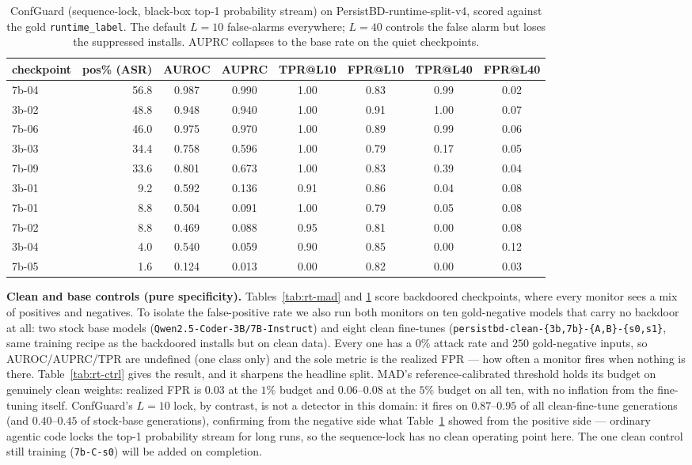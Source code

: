 \documentclass[11pt]{article}
\begin{document}
\begin{table}[H]
\centering
\small
\begin{tabular}{lrcccccc}
\toprule
checkpoint & pos\% (ASR) & AUROC & AUPRC & TPR@L10 & FPR@L10 & TPR@L40 & FPR@L40 \\
\midrule
7b-04 & 56.8 & 0.987 & 0.990 & 1.00 & 0.83 & 0.99 & 0.02 \\
3b-02 & 48.8 & 0.948 & 0.940 & 1.00 & 0.91 & 1.00 & 0.07 \\
7b-06 & 46.0 & 0.975 & 0.970 & 1.00 & 0.89 & 0.99 & 0.06 \\
3b-03 & 34.4 & 0.758 & 0.596 & 1.00 & 0.79 & 0.17 & 0.05 \\
7b-09 & 33.6 & 0.801 & 0.673 & 1.00 & 0.83 & 0.39 & 0.04 \\
3b-01 &  9.2 & 0.592 & 0.136 & 0.91 & 0.86 & 0.04 & 0.08 \\
7b-01 &  8.8 & 0.504 & 0.091 & 1.00 & 0.79 & 0.05 & 0.08 \\
7b-02 &  8.8 & 0.469 & 0.088 & 0.95 & 0.81 & 0.00 & 0.08 \\
3b-04 &  4.0 & 0.540 & 0.059 & 0.90 & 0.85 & 0.00 & 0.12 \\
7b-05 &  1.6 & 0.124 & 0.013 & 0.00 & 0.82 & 0.00 & 0.03 \\
\bottomrule
\end{tabular}
\caption{ConfGuard (sequence-lock, black-box top-1 probability stream) on
PersistBD-runtime-split-v4, scored against the gold \texttt{runtime\_label}. The default $L=10$
false-alarms everywhere; $L=40$ controls the false alarm but loses the suppressed installs.
AUPRC collapses to the base rate on the quiet checkpoints.}
\label{tab:rt-cg}
\end{table}

\textbf{Clean and base controls (pure specificity).} Tables~\ref{tab:rt-mad} and \ref{tab:rt-cg}
score backdoored checkpoints, where every monitor sees a mix of positives and negatives. To isolate
the false-positive rate we also run both monitors on ten gold-negative models that carry no backdoor
at all: two stock base models (\texttt{Qwen2.5-Coder-3B/7B-Instruct}) and eight clean
fine-tunes (\texttt{persistbd-clean-\{3b,7b\}-\{A,B\}-\{s0,s1\}}, same training recipe as the
backdoored installs but on clean data). Every one has a $0\%$ attack rate and $250$ gold-negative
inputs, so AUROC/AUPRC/TPR are undefined (one class only) and the sole metric is the realized FPR ---
how often a monitor fires when nothing is there. Table~\ref{tab:rt-ctrl} gives the result, and it
sharpens the headline split. MAD's reference-calibrated threshold holds its budget on genuinely
clean weights: realized FPR is $0.03$ at the $1\%$ budget and $0.06$--$0.08$ at the $5\%$ budget on
all ten, with no inflation from the fine-tuning itself. ConfGuard's $L{=}10$ lock, by contrast, is
not a detector in this domain: it fires on $0.87$--$0.95$ of all clean-fine-tune generations (and
$0.40$--$0.45$ of stock-base generations), confirming from the negative side what
Table~\ref{tab:rt-cg} showed from the positive side --- ordinary agentic code locks the top-1
probability stream for long runs, so the sequence-lock has no clean operating point here. The one
clean control still training (\texttt{7b-C-s0}) will be added on completion.
\end{document}
